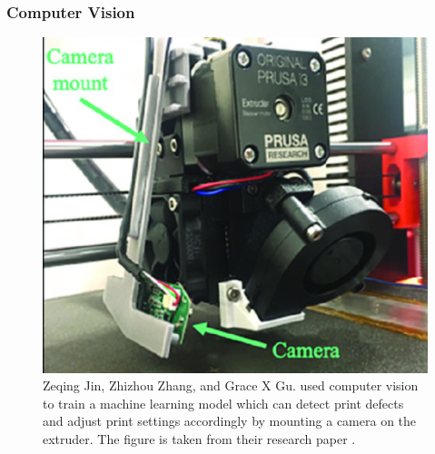 \subsubsection{Computer Vision}

\begin{figure}
    \centering
    \includegraphics[width=0.9\linewidth]{assets/computer_vision_illustration.png}
    \caption{Zeqing Jin, Zhizhou Zhang, and Grace X Gu. used computer vision to train a machine learning model which can detect print defects and adjust print settings accordingly by mounting a camera on the extruder. The figure is taken from their research paper \cite{jin2019autonomous}.}
    \label{figure/mountedCamera}
\end{figure}

